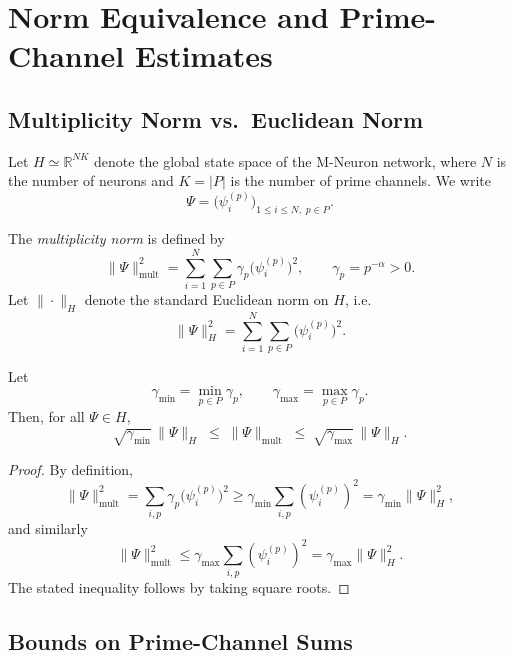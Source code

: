 \documentclass[11pt]{article}
\begin{document}
\section{Norm Equivalence and Prime-Channel Estimates}

\subsection{Multiplicity Norm vs.\ Euclidean Norm}

Let \(H \simeq \mathbb{R}^{N K}\) denote the global state space of the M-Neuron network, where \(N\) is the number of neurons and \(K = |P|\) is the number of prime channels. We write
\[
\Psi = \bigl(\psi_i^{(p)}\bigr)_{1 \le i \le N,\; p \in P}.
\]

The \emph{multiplicity norm} is defined by
\begin{equation}
\label{eq:mult-norm-app}
\|\Psi\|_{\mathrm{mult}}^2
= \sum_{i=1}^N \sum_{p\in P} \gamma_p \bigl(\psi_i^{(p)}\bigr)^2,
\qquad \gamma_p = p^{-\alpha} > 0.
\end{equation}
Let \(\|\cdot\|_H\) denote the standard Euclidean norm on \(H\), i.e.
\[
\|\Psi\|_H^2 = \sum_{i=1}^N \sum_{p\in P} \bigl(\psi_i^{(p)}\bigr)^2.
\]

\begin{lemma}
\label{lem:norm-equivalence}
Let
\[
\gamma_{\min} = \min_{p\in P} \gamma_p, \qquad
\gamma_{\max} = \max_{p\in P} \gamma_p.
\]
Then, for all \(\Psi \in H\),
\begin{equation}
\label{eq:norm-equivalence-app}
\sqrt{\gamma_{\min}}\,\|\Psi\|_H
\;\le\; \|\Psi\|_{\mathrm{mult}}
\;\le\; \sqrt{\gamma_{\max}}\,\|\Psi\|_H.
\end{equation}
\end{lemma}

\begin{proof}
By definition,
\[
\|\Psi\|_{\mathrm{mult}}^2
= \sum_{i,p} \gamma_p \bigl(\psi_i^{(p)}\bigr)^2
\ge \gamma_{\min} \sum_{i,p} (\psi_i^{(p)})^2
= \gamma_{\min} \|\Psi\|_H^2,
\]
and similarly
\[
\|\Psi\|_{\mathrm{mult}}^2
\le \gamma_{\max} \sum_{i,p} (\psi_i^{(p)})^2
= \gamma_{\max} \|\Psi\|_H^2.
\]
The stated inequality follows by taking square roots.
\end{proof}

\subsection{Bounds on Prime-Channel Sums}
\end{document}
